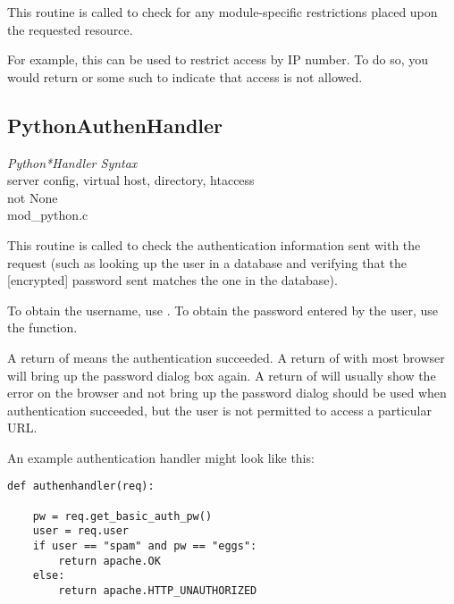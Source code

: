 This routine is called to check for any module-specific restrictions
placed upon the requested resource.

For example, this can be used to restrict access by IP number. To do
so, you would return  or some such to indicate
that access is not allowed.

\subsection{PythonAuthenHandler\label{dir-handlers-auh}}

\emph{Python*Handler Syntax}\\
server config, virtual host, directory, htaccess\\
not None\\
mod_python.c

This routine is called to check the authentication information sent
with the request (such as looking up the user in a database and
verifying that the [encrypted] password sent matches the one in the
database).

To obtain the username, use . To obtain the password
entered by the user, use the  function.

A return of  means the authentication succeeded. A
return of  with most browser will bring
up the password dialog box again. A return of
 will usually show the error on the
browser and not bring up the password dialog
 should be used when authentication
succeeded, but the user is not permitted to access a particular URL.

An example authentication handler might look like this: 

\begin{verbatim}
def authenhandler(req):

    pw = req.get_basic_auth_pw()
    user = req.user     
    if user == "spam" and pw == "eggs":
        return apache.OK
    else:
        return apache.HTTP_UNAUTHORIZED
\end{verbatim}    

